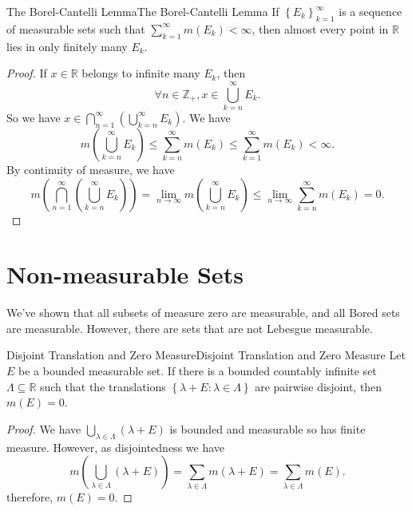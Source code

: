 \documentclass[../main.tex]{subfiles}
\begin{document}
\begin{theorem}{The Borel-Cantelli Lemma}{The Borel-Cantelli Lemma}
	If $\left\{ E_k \right\}_{k=1}^{\infty }$ is a sequence of measurable sets such that $\sum_{k=1}^{\infty } m(E_k) < \infty $, then almost every point in $\mathbb{R}$ lies in only finitely many $E_k$.
\end{theorem}
\begin{proof}
If $x\in \mathbb{R}$ belongs to infinite many $E_k$, then
\begin{equation*}
\forall n\in \mathbb{Z}_+, x\in \bigcup_{k=n}^{\infty } E_k.
\end{equation*}
So we have $\displaystyle x\in \bigcap_{n=1}^{\infty } \left( \bigcup_{k=n}^{\infty } E_k \right)$. We have
\begin{equation*}
	m \left(\bigcup_{k=n}^{\infty } E_k\right) \leq \sum_{k=n}^{\infty } m(E_k) \leq \sum_{k=1}^{\infty } m(E_k) < \infty.
\end{equation*}
By continuity of measure, we have
\begin{equation*}
	m \left(\bigcap_{n=1}^{\infty } \left( \bigcup_{k=n}^{\infty } E_k \right) \right) = \lim_{n \to \infty } m \left(\bigcup_{k=n}^{\infty } E_k \right) \leq \lim_{n \to \infty } \sum_{k=n}^{\infty } m(E_k) = 0.
\end{equation*}
\end{proof}

\section{Non-measurable Sets}

We've shown that all subsets of measure zero are measurable, and all Bored sets are measurable. However, there are sets that are not Lebesgue measurable. 

\begin{lemma}{Disjoint Translation and Zero Measure}{Disjoint Translation and Zero Measure}
Let $E$ be a bounded measurable set. If there is a bounded countably infinite set $\Lambda \subseteq \mathbb{R}$ such that the translations $\left\{ \lambda + E: \lambda\in \Lambda \right\}$ are pairwise disjoint, then $m(E) = 0$.
\end{lemma}
\begin{proof}
	We have $\displaystyle \bigcup_{\lambda\in \Lambda} (\lambda+E) $ is bounded and measurable so has finite measure. However, as disjointedness we have
	\begin{equation*}
		m\left( \bigcup_{\lambda\in \Lambda} (\lambda+E) \right) = \sum_{\lambda\in \Lambda} m(\lambda+E) = \sum_{\lambda\in \Lambda} m(E).
	\end{equation*}
	therefore, $m(E)=0$.
\end{proof}
\end{document}
